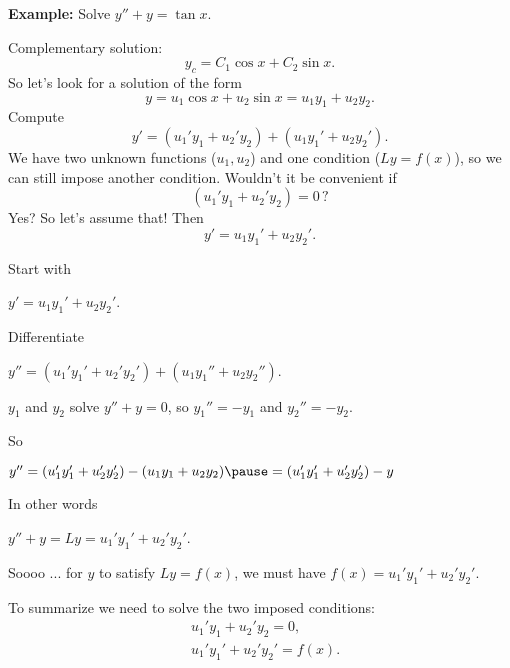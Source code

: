 \documentclass[10pt,aspectratio=169]{beamer}
\begin{document}
\begin{frame}
\textbf{Example:}
Solve $y''+y=\tan x$.

\medskip
\pause

Complementary solution:
\[
y_c = C_1 \cos x + C_2 \sin x .
\]
\pause
So let's look for a solution of the form
\[
y = u_1 \cos x + u_2 \sin x = u_1 y_1 + u_2 y_2 .
\]
\pause
Compute
\[
y' = (u_1' y_1 + u_2' y_2) + (u_1 y_1' + u_2 y_2').
\]
\pause
We have two unknown functions ($u_1,u_2$) and one condition ($Ly=f(x)$),
so we can still impose another condition.
\pause
Wouldn't it be convenient if
\[
(u_1' y_1 + u_2' y_2) = 0 \, ?
\]
\pause
Yes?  So let's assume that!
\pause
Then
\[
y' = u_1 y_1' + u_2 y_2' .
\]

\end{frame}

\begin{frame}
Start with

\quad
$y' = u_1 y_1' + u_2 y_2'$.

\medskip
\pause

Differentiate

\quad
$y'' = (u_1' y_1' + u_2' y_2') + (u_1 y_1'' + u_2 y_2'')$.

\medskip
\pause

$y_1$ and $y_2$ solve $y''+y = 0$, so $y_1'' = - y_1$ and $y_2'' = - y_2$.

\medskip
\pause

So

\quad
$y'' =
(u_1' y_1' + u_2' y_2') - (u_1 y_1 + u_2 y_2) 
\pause
=
(u_1' y_1' + u_2' y_2') - y
$

\medskip
\pause

In other words

\quad
$y'' + y = Ly = u_1' y_1' + u_2' y_2'$.

\medskip

\pause
Soooo ...  for $y$ to satisfy $Ly = f(x)$, we must have
$f(x) = u_1' y_1' + u_2' y_2'$.

\medskip
\pause

To summarize we need to solve the two imposed conditions:
\[
\boxed{~~
\begin{aligned}
& u_1' y_1 + u_2' y_2 = 0 ,\\
& u_1' y_1' + u_2' y_2' = f(x) .
\end{aligned}
~~}
\]

\end{frame}
\end{document}
